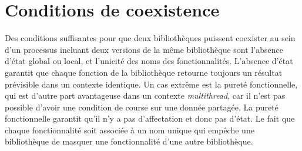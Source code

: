 


\section{Conditions de coexistence}
%
Des conditions suffisantes pour que deux bibliothèques puissent coexister
au sein d'un processus incluant deux versions de la même bibliothèque
sont l'absence d'état global ou local, et l'unicité des noms des
fonctionnalités.  L'absence d'état garantit que chaque fonction de la
bibliothèque retourne toujours un résultat prévisible dans un contexte
identique. Un cas extrême est la pureté fonctionnelle, qui est d'autre part
avantageuse dans un contexte \textit{multithread}, car il n'est pas possible
d'avoir une condition de course sur une donnée partagée. La pureté
fonctionnelle garantit qu'il n'y a pas d'affectation et donc pas d'état.  Le
fait que chaque fonctionnalité soit associée à un nom unique qui empêche une
bibliothèque de masquer une fonctionnalité d'une autre bibliothèque.


